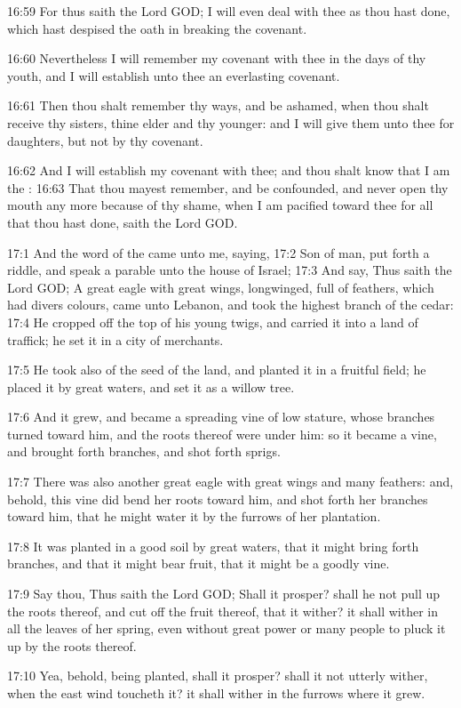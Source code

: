 16:59 For thus saith the Lord GOD; I will even deal with thee as thou hast done, which hast despised the oath in breaking the covenant.

16:60 Nevertheless I will remember my covenant with thee in the days of thy youth, and I will establish unto thee an everlasting covenant.

16:61 Then thou shalt remember thy ways, and be ashamed, when thou shalt receive thy sisters, thine elder and thy younger: and I will give them unto thee for daughters, but not by thy covenant.

16:62 And I will establish my covenant with thee; and thou shalt know that I am the \LORD: 16:63 That thou mayest remember, and be confounded, and never open thy mouth any more because of thy shame, when I am pacified toward thee for all that thou hast done, saith the Lord GOD.

17:1 And the word of the \LORD came unto me, saying, 17:2 Son of man, put forth a riddle, and speak a parable unto the house of Israel; 17:3 And say, Thus saith the Lord GOD; A great eagle with great wings, longwinged, full of feathers, which had divers colours, came unto Lebanon, and took the highest branch of the cedar: 17:4 He cropped off the top of his young twigs, and carried it into a land of traffick; he set it in a city of merchants.

17:5 He took also of the seed of the land, and planted it in a fruitful field; he placed it by great waters, and set it as a willow tree.

17:6 And it grew, and became a spreading vine of low stature, whose branches turned toward him, and the roots thereof were under him: so it became a vine, and brought forth branches, and shot forth sprigs.

17:7 There was also another great eagle with great wings and many feathers: and, behold, this vine did bend her roots toward him, and shot forth her branches toward him, that he might water it by the furrows of her plantation.

17:8 It was planted in a good soil by great waters, that it might bring forth branches, and that it might bear fruit, that it might be a goodly vine.

17:9 Say thou, Thus saith the Lord GOD; Shall it prosper? shall he not pull up the roots thereof, and cut off the fruit thereof, that it wither? it shall wither in all the leaves of her spring, even without great power or many people to pluck it up by the roots thereof.

17:10 Yea, behold, being planted, shall it prosper? shall it not utterly wither, when the east wind toucheth it? it shall wither in the furrows where it grew.

